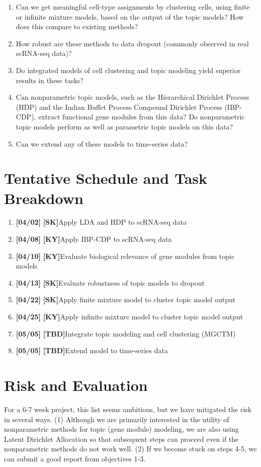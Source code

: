 \documentclass[11pt]{article}
\newcommand\tab[1][1cm]{\hspace*{#1}}
\newcommand{\SK}{\textbf{[SK]}\tab}
\newcommand{\KY}{\textbf{[KY]}\tab}
\newcommand{\TBD}{\textbf{[TBD]}\tab}
\newcommand\cdate[1][1cm]{\textbf{[#1]}}
\begin{document}
\begin{enumerate}
    \item Can we get meaningful cell-type assignments by clustering cells, using finite or infinite mixture models, based on the output of the topic models? How does this compare to existing methods?
    \item How robust are these methods to data dropout (commonly observed in real scRNA-seq data)?
    \item Do integrated models of cell clustering and topic modeling yield superior results in these tasks? 
    \item Can nonparametric topic models, such as the Hierarchical Dirichlet Process (HDP) and the Indian Buffet Process Compound Dirichlet Process (IBP-CDP), extract functional gene modules from this data? Do nonparametric topic models perform as well as parametric topic models on this data?
    \item Can we extend any of these models to time-series data?
\end{enumerate}

\section{Tentative Schedule and Task Breakdown}
\begin{enumerate}
    \item \cdate[04/02] \SK Apply LDA and HDP to scRNA-seq data
    \item \cdate[04/08] \KY Apply IBP-CDP to scRNA-seq data
    \item \cdate[04/10] \KY Evaluate biological relevance of gene modules from topic models
    \item \cdate[04/13] \SK Evaluate robustness of topic models to dropout
    \item \cdate[04/22] \SK Apply finite mixture model to cluster topic model output
    \item \cdate[04/25] \KY Apply infinite mixture model to cluster topic model output
    \item \cdate[05/05] \TBD Integrate topic modeling and cell clustering (MGCTM)
    \item \cdate[05/05] \TBD Extend model to time-series data
\end{enumerate}

\section{Risk and Evaluation}
For a 6-7 week project, this list seems ambitious, but we have mitigated the risk in several ways. (1) Although we are primarily interested in the utility of nonparametric methods for topic (gene module) modeling, we are also using Latent Dirichlet Allocation so that subsequent steps can proceed even if the nonparametric methods do not work well. (2) If we become stuck on steps 4-5, we can submit a good report from objectives 1-3. \\
\end{document}
